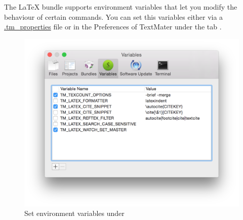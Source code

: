 \documentclass[11pt, x11names]{article}
\begin{document}
The LaTeX bundle supports environment variables that let you modify the behaviour of certain commands. You can set this variables either via a \href{http://blog.macromates.com/2011/git-style-configuration}{.tm\_properties} file or in the Preferences of TextMater under the tab .

\begin{figure}[h]
  \centering
    \includegraphics[width=.8\textwidth]{Figures/TextMate Preferences - Variables.png}
  \caption{Set environment variables under }
  \label{fig:Figures_TextMate_Preferences_-_Variables}
\end{figure}
\end{document}
